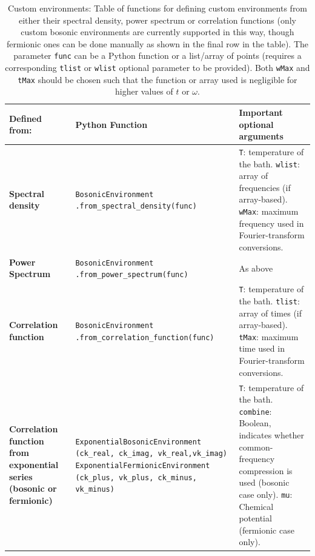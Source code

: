 \documentclass[preprint,3p,sort&compress]{elsarticle}
\def\code#1{\texttt{#1}}
\begin{document}
\begin{table}[h]
\centering
     \renewcommand{\arraystretch}{1} 
\begin{tabular}{@{}p{4cm}p{6cm}p{5.5cm}@{}}
\toprule
\textbf{Defined from:} &
\textbf{Python Function} &
\textbf{Important optional arguments}\\ \midrule

\textbf{Spectral density} & \code{BosonicEnvironment} \code{.from\_spectral\_density(func)}  & 
\code{T}: temperature of the bath. \code{wlist}: array of frequencies (if array-based). \code{wMax}: maximum frequency used in Fourier-transform conversions.
\\
\midrule
\textbf{Power Spectrum} & \code{BosonicEnvironment} \code{.from\_power\_spectrum(func)} & As above\\ 
\midrule
\textbf{Correlation function} & \code{BosonicEnvironment} \code{.from\_correlation\_function(func)}&
\code{T}: temperature of the bath.  \code{tlist}: array of times (if array-based). \code{tMax}: maximum time used in Fourier-transform conversions. \\ 
\midrule
\textbf{Correlation function from exponential series (bosonic or fermionic)} 
& 
\code{ExponentialBosonicEnvironment} \code{(ck\_real, ck\_imag, vk\_real,vk\_imag)}
\code{ExponentialFermionicEnvironment} \code{(ck\_plus, vk\_plus, ck\_minus, vk\_minus)} &

\code{T}: temperature of the bath. \code{combine}: Boolean,  indicates whether common-frequency compression is used (bosonic case only). \code{mu}: Chemical potential (fermionic case only).\\ 

\bottomrule
\end{tabular}
\caption{Custom environments: Table of functions for defining custom environments from either their spectral density, power spectrum or correlation functions (only custom bosonic environments are currently supported in this way, though fermionic ones can be done manually as shown in the final row in the table). The parameter \code{func} can be a Python function or a list/array of points (requires a corresponding \code{tlist} or \code{wlist} optional parameter to be provided). Both \code{wMax} and \code{tMax} should be chosen such that the function or array used is negligible for higher values of $t$ or $\omega$.}\label{tab:custom}
\end{table}
\end{document}
